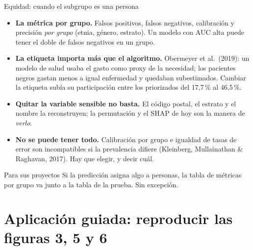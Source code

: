 \documentclass{beamer}
\newcommand{\1}{\mathbb{I}}
\begin{document}
\begin{frame}{Equidad: cuando el subgrupo es una persona}
\small
\begin{itemize}\itemsep2pt
  \item \textbf{La métrica por grupo.} Falsos positivos, falsos negativos, calibración y precisión \emph{por grupo} (etnia, género, estrato). Un modelo con AUC alta puede tener el doble de falsos negativos en un grupo. \pause
  \item \textbf{La etiqueta importa más que el algoritmo.} Obermeyer et al.\ (2019): un modelo de salud usaba el gasto como proxy de la necesidad; los pacientes negros gastan menos a igual enfermedad y quedaban subestimados. Cambiar la etiqueta subía su participación entre los priorizados del 17,7\,\% al 46,5\,\%. \pause
  \item \textbf{Quitar la variable sensible no basta.} El código postal, el estrato y el nombre la reconstruyen; la permutación y el SHAP de hoy son la manera de \emph{verlo}. \pause
  \item \textbf{No se puede tener todo.} Calibración por grupo e igualdad de tasas de error son incompatibles si la prevalencia difiere (Kleinberg, Mullainathan \& Raghavan, 2017). Hay que elegir, y decir cuál.
\end{itemize}
\pause
\begin{block}{Para sus proyectos}
Si la predicción asigna algo a personas, la tabla de métricas por grupo va junto a la tabla de la prueba. Sin excepción.
\end{block}
\end{frame}


\section{Aplicación guiada: reproducir las figuras 3, 5 y 6}
\begin{frame}[noframenumbering]
\tableofcontents[currentsection]
\end{frame}
\end{document}
